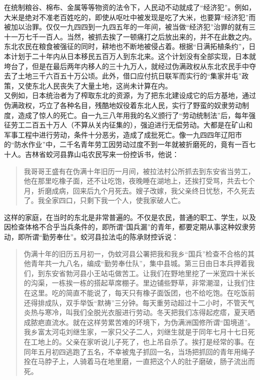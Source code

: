 在统制粮谷、棉布、金属等等物资的法令下，人民动不动就成了“经济犯”。例如，大米是绝对不准老百姓吃的，即使从呕吐中被发现是吃了大米，也要算“经济犯”而被加以治罪。仅仅一九四四到一九四五年的一年间，被当做“经济犯”治罪的就有三十一万七千一百人。当然，被抓去挨了一顿痛打之后放出来的，并不在此数之内。\\

东北农民在粮食被强征的同时，耕地也不断地被侵占着。根据“日满拓植条约”，日本计划于二十年内从日本移民五百万人到东北来。这个计划没有全部实现，日本就垮台了，但是在最后两年内移人的三十九万人，就经过伪满政权从东北农民手中夺去了土地三千六百五十万公顷。此外，借口应付抗日联军而实行的“集家并屯”政策，又使东北人民丧失了大量土地，这尚未计算在内。\\

又例如，日本统治者为了榨取东北的资源，为了把东北建设成它的后方基地，通过伪满政权，巧立了各种名目，残酷地奴役着东北人民，实行了野蛮的奴隶劳动制度，造成了惊人的死亡。自一九三八年用我的名义颁行了“劳动统制法”后，每年强征劳工二百五十万人（不算从关内征集的），强迫进行无偿劳动。大都是在矿山和军事工程中进行劳动，条件十分恶劣，造成了成批死亡。像一九四四年辽阳市的“防水作业”中，二千名青年劳工因劳动过度不到一年就被折磨死的，竟有一百七十人。吉林省蛟河县靠山屯农民写来一份控诉书，他说：\\

\begin{quote}
	我哥哥王盛有在伪满十年旧历一月间，被拉法村公所抓去到东安省当劳工，他在那里吃橡子面，还不让吃饱，夜晚睡在湖地上，还挨打受骂，共去七个月，折磨成病，回来后九个月死去。嫂子改嫁，我父亲终日忧愁，不久死去了。我全家四口，只剩下我一个人，使我家破人亡。\\
\end{quote}

这样的家庭，在当时的东北是非常普遍的。不仅是农民，普通的职工、学生，以及因检查体格不合乎当兵条件的，即所谓“国兵漏”的青年，都要定期从事这种奴隶劳动，即所谓“勤劳奉仕”。蛟河县拉法屯的陈承财控诉说：\\

\begin{quote}
	伪满十年的旧历五月初一，伪蚊河县公署把我和我乡“国兵”检查不合格的其他青年共一九八名，编成“勤劳奉仕队”，集中县城。第三日由日本兵押着我们，到东安省勃河县小王站屯做苦工。让我们在野地里挖了一米宽四十米长的沟渠，一栋挨一栋的搭起草席棚子。里边铺些野草，非常潮湿，让我们住在这里。吃的简直不能说了，每天只有橡子面饭团，也不给吃饱。在吃饭前还得排成队，双手举饭“默祷”三分钟。每天重劳动超过十二小时，不管天气炎热与寒冷，叫我们全脱光衣服进行劳动。冬天把我们冻得起疙瘩，夏天晒成脓疤直流水。就在这样劳累苦难的环境下，为伪满洲国修所谓“国境道”。我乡富太河屯刘继生家，一家只父子二人，刘继生就是于同年七月十七日死在工地上的。父亲在家听说儿子死了，也上吊自杀了。挨打是经常的事。在同年五月初四逃跑了五名，不幸被鬼子抓回一名，当场把抓回的青年用绳子拴在马脖子上，人骑着马在地里磨，一直把这个人的肚子磨破，肠子流出而死。\\
\end{quote}

